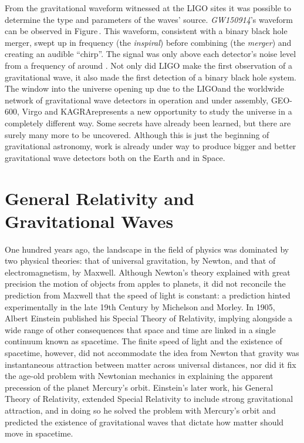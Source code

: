 From the gravitational waveform witnessed at the LIGO sites it was possible to determine the type and parameters of the waves' source. \emph{GW150914}'s waveform can be observed in Figure\,. This waveform, consistent with a binary black hole merger, swept up in frequency (the \emph{inspiral}) before combining (the \emph{merger}) and creating an audible ``chirp''. The signal was only above each detector's noise level from a frequency of around . Not only did LIGO make the first observation of a gravitational wave, it also made the first detection of a binary black hole system. The window into the universe opening up due to the LIGO\textemdash and the worldwide network of gravitational wave detectors in operation and under assembly, GEO-600, Virgo and KAGRA\textemdash represents a new opportunity to study the universe in a completely different way. Some secrets have already been learned, but there are surely many more to be uncovered. Although this is just the beginning of gravitational astronomy, work is already under way to produce bigger and better gravitational wave detectors both on the Earth and in Space.

\section{General Relativity and Gravitational Waves}

One hundred years ago, the landscape in the field of physics was dominated by two physical theories: that of universal gravitation, by Newton, and that of electromagnetism, by Maxwell. Although Newton's theory explained with great precision the motion of objects from apples to planets, it did not reconcile the prediction from Maxwell that the speed of light is constant: a prediction hinted experimentally in the late 19th Century by Michelson and Morley. In 1905, Albert Einstein published his Special Theory of Relativity, implying alongside a wide range of other consequences that space and time are linked in a single continuum known as spacetime. The finite speed of light and the existence of spacetime, however, did not accommodate the idea from Newton that gravity was instantaneous attraction between matter across universal distances, nor did it fix the age-old problem with Newtonian mechanics in explaining the apparent precession of the planet Mercury's orbit. Einstein's later work, his General Theory of Relativity, extended Special Relativity to include strong gravitational attraction, and in doing so he solved the problem with Mercury's orbit and predicted the existence of gravitational waves that dictate how matter should move in spacetime.

